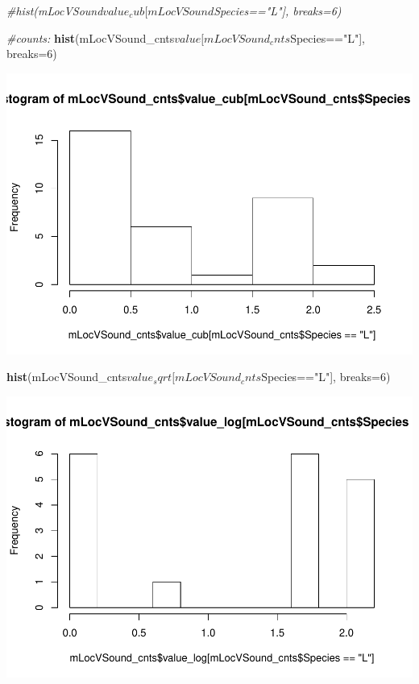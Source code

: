 \documentclass[]{article}
\newenvironment{Shaded}{\begin{snugshade}}{\end{snugshade}}
\newcommand{\KeywordTok}[1]{\textcolor[rgb]{0.13,0.29,0.53}{\textbf{{#1}}}}
\newcommand{\DataTypeTok}[1]{\textcolor[rgb]{0.13,0.29,0.53}{{#1}}}
\newcommand{\DecValTok}[1]{\textcolor[rgb]{0.00,0.00,0.81}{{#1}}}
\newcommand{\StringTok}[1]{\textcolor[rgb]{0.31,0.60,0.02}{{#1}}}
\newcommand{\CommentTok}[1]{\textcolor[rgb]{0.56,0.35,0.01}{\textit{{#1}}}}
\newcommand{\NormalTok}[1]{{#1}}
\begin{document}
\begin{Shaded}
\begin{Highlighting}[]
\CommentTok{#hist(mLocVSound$value_cub[mLocVSound$Species=="L"], breaks=6)}


\CommentTok{#counts:}
\KeywordTok{hist}\NormalTok{(mLocVSound_cnts$value[mLocVSound_cnts$Species==}\StringTok{"L"}\NormalTok{], }\DataTypeTok{breaks=}\DecValTok{6}\NormalTok{)}
\end{Highlighting}
\end{Shaded}

\includegraphics{Sensory_learning_files/figure-latex/unnamed-chunk-17-11.pdf}

\begin{Shaded}
\begin{Highlighting}[]
\KeywordTok{hist}\NormalTok{(mLocVSound_cnts$value_sqrt[mLocVSound_cnts$Species==}\StringTok{"L"}\NormalTok{], }\DataTypeTok{breaks=}\DecValTok{6}\NormalTok{)}
\end{Highlighting}
\end{Shaded}

\includegraphics{Sensory_learning_files/figure-latex/unnamed-chunk-17-12.pdf}
\end{document}
